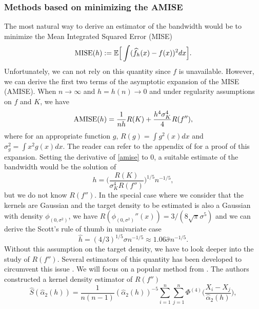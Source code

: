 \subsubsection{Methods based on minimizing the AMISE}
The most natural way to derive an estimator of the bandwidth would be to minimize the Mean Integrated Squared Error (MISE)
\begin{equation}
    \label{mise}
    \textnormal{MISE}(h) := {\mathbb E}\Big[\int(\widehat f_h(x)-f(x))^2dx \Big].
\end{equation}
Unfortunately, we can not rely on this quantity since $f$ is unavailable. However, we can derive the first two terms of the asymptotic expansion of the MISE (AMISE). When $n\rightarrow\infty$ and $h=h(n)\rightarrow 0$ and under regularity assumptions on $f$ and $K$, we have
\begin{equation}
\label{amise}
    \textnormal{AMISE}(h) = \frac{1}{nh}R(K) +\frac{h^4\sigma^4_K}{4}R(f''),
\end{equation}
where for an appropriate function $g$, $R(g)=\int g^2(x) dx$ and $\sigma_g^2=\int x^2g(x) dx$. The reader can refer to the appendix of \citep{tsybakov2009Nonparametric} for a proof of this expansion. Setting the derivative of \cref{amise} to $0$, a suitable estimate of the bandwidth would be the solution of
\begin{equation}
\label{amise_diff_sol}
    h = \bigg(\frac{R(K)}{\sigma_K^4R(f'')}\bigg)^{1/5}n^{-1/5},
\end{equation}
but we do not know $R(f'')$.  In the special case where we consider that the kernels are Gaussian and the target density to be estimated is also a Gaussian with density $\phi_{(0,\sigma^2)}$, we have $R(\phi_{(0,\sigma^2)}''(x)) = 3/(8\sqrt{\pi}\sigma^5)$ and we can derive the Scott's rule of thumb in univariate case \citep{scott_multivariate_2015}
\begin{equation}
    \hat h = (4/3)^{1/5}\sigma n^{-1/5} \approx 1.06\hat\sigma n^{-1/5}.
\end{equation}
Without this assumption on the target density, we have to look deeper into the study of $R(f'')$. Several estimators of this quantity has been developed to circumvent this issue \citep{HallMarron87, sheatherj91, sheather_bdwth}. We will focus on a popular method from \citep{sheather_bdwth}. The authors constructed a kernel density estimator of $R(f'')$
\begin{equation}
\label{sj_est_f2}
    \hat S(\hat\alpha_2(h)) = \frac{1}{n(n-1)}(\hat\alpha_2(h))^{-5}\sum_{i=1}^n\sum_{j=1}^n\Phi^{(4)}\Big(\frac{X_i-X_j}{\hat\alpha_2(h)}\Big),
\end{equation}
